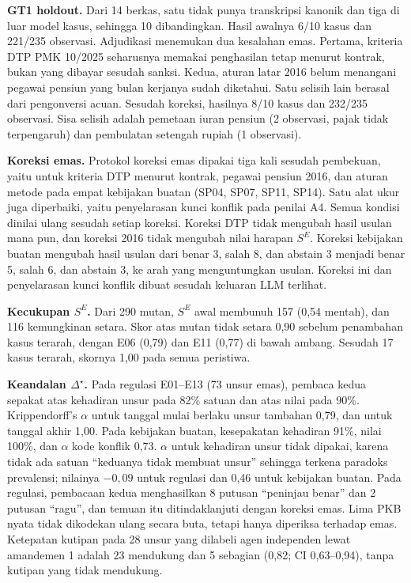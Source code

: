 \documentclass[journal,a4paper]{IEEEtran}
\makeatletter
\DeclareRobustCommand{\en}[1]{{\usefont{\f@encoding}{\f@family}{\f@series}{it}#1\/}}
\newcommand{\emas}{\star}
\newcommand{\SE}{S^{E}}
\makeatother
\begin{document}
\textbf{GT1 \en{holdout}.} Dari 14 berkas, satu tidak punya transkripsi kanonik dan tiga di luar model kasus, sehingga 10 dibandingkan. Hasil awalnya 6/10 kasus dan 221/235 observasi. Adjudikasi menemukan dua kesalahan emas. Pertama, kriteria DTP PMK 10/2025 seharusnya memakai penghasilan tetap menurut kontrak, bukan yang dibayar sesudah sanksi. Kedua, aturan latar 2016 belum menangani pegawai pensiun yang bulan kerjanya sudah diketahui. Satu selisih lain berasal dari pengonversi acuan. Sesudah koreksi, hasilnya 8/10 kasus dan 232/235 observasi. Sisa selisih adalah pemetaan iuran pensiun (2 observasi, pajak tidak terpengaruh) dan pembulatan setengah rupiah (1 observasi).

\textbf{Koreksi emas.} Protokol koreksi emas dipakai tiga kali sesudah pembekuan, yaitu untuk kriteria DTP menurut kontrak, pegawai pensiun 2016, dan aturan metode pada empat kebijakan buatan (SP04, SP07, SP11, SP14). Satu alat ukur juga diperbaiki, yaitu penyelarasan kunci konflik pada penilai A4. Semua kondisi dinilai ulang sesudah setiap koreksi. Koreksi DTP tidak mengubah hasil usulan mana pun, dan koreksi 2016 tidak mengubah nilai harapan $\SE$. Koreksi kebijakan buatan mengubah hasil usulan dari benar 3, salah 8, dan \en{abstain} 3 menjadi benar 5, salah 6, dan \en{abstain} 3, ke arah yang menguntungkan usulan. Koreksi ini dan penyelarasan kunci konflik dibuat sesudah keluaran LLM terlihat.

\textbf{Kecukupan $\SE$.} Dari 290 mutan, $\SE$ awal membunuh 157 (0,54 mentah), dan 116 kemungkinan setara. Skor atas mutan tidak setara 0,90 sebelum penambahan kasus terarah, dengan E06 (0,79) dan E11 (0,77) di bawah ambang. Sesudah 17 kasus terarah, skornya 1,00 pada semua peristiwa.

\textbf{Keandalan $\Delta^{\emas}$.} Pada regulasi E01--E13 (73 unsur emas), pembaca kedua sepakat atas kehadiran unsur pada 82\% satuan dan atas nilai pada 90\%. Krippendorff's $\alpha$ untuk tanggal mulai berlaku unsur tambahan 0,79, dan untuk tanggal akhir 1,00. Pada kebijakan buatan, kesepakatan kehadiran 91\%, nilai 100\%, dan $\alpha$ kode konflik 0,73. $\alpha$ untuk kehadiran unsur tidak dipakai, karena tidak ada satuan ``keduanya tidak membuat unsur'' sehingga terkena paradoks prevalensi; nilainya $-0{,}09$ untuk regulasi dan 0,46 untuk kebijakan buatan. Pada regulasi, pembacaan kedua menghasilkan 8 putusan ``peninjau benar'' dan 2 putusan ``ragu'', dan temuan itu ditindaklanjuti dengan koreksi emas. Lima PKB nyata tidak dikodekan ulang secara buta, tetapi hanya diperiksa terhadap emas. Ketepatan kutipan pada 28 unsur yang dilabeli agen independen lewat amandemen 1 adalah 23 mendukung dan 5 sebagian (0,82; CI 0,63--0,94), tanpa kutipan yang tidak mendukung.
\end{document}
